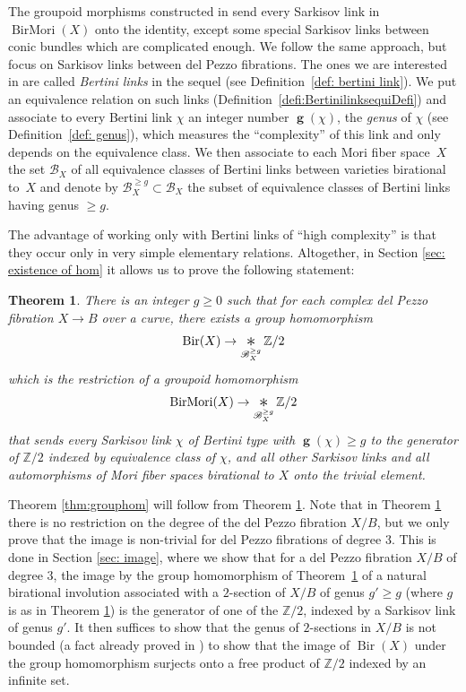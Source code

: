 \documentclass[11pt]{article}
\numberwithin{equation}{section}
\DeclareMathOperator{\Bir}{Bir}
\DeclareMathOperator{\inv}{\boldsymbol{g}}
\DeclareMathOperator{\BirMori}{BirMori}
\theoremstyle{plain}
\newtheorem{maintheorem}{Theorem}
\theoremstyle{definition}
\newcommand{\ZZ}{\mathbb Z}
\newcommand{\Bertini}{\mathscr B}
\newcommand{\bigast}{\mathop{\mathchoice{\vcenter{\hbox{\scalebox{1.5}{$\ast$}}}}{\ast}{\ast}{\ast}}}
\begin{document}
The groupoid morphisms constructed in \cite{BLZ} send every Sarkisov link in $\BirMori(X)$ onto the identity, except some special Sarkisov links between conic bundles which are complicated enough. We follow the same approach, but focus on Sarkisov links between del Pezzo fibrations. The ones we are interested in are called \emph{Bertini links} in the sequel (see Definition~\ref{def: bertini link}). We put an equivalence relation on such links (Definition~\ref{defi:BertinilinksequiDefi}) and associate to every Bertini link $\chi$ an integer number $\inv(\chi)$, the \emph{genus} of $\chi$ (see Definition~\ref{def: genus}), which measures the ``complexity'' of this link and only depends on the equivalence class. We then associate to each Mori fiber space~$X$ the set $\Bertini_X$ of all equivalence classes of Bertini links between varieties birational to~$X$ and denote by $\Bertini_X^{\ge g}\subset \Bertini_X$ the subset of equivalence classes of Bertini links having genus $\ge g$.

The advantage of working only with Bertini links of ``high complexity'' is that they occur only in very simple elementary relations. Altogether, in Section \ref{sec: existence of hom} it allows us to prove the following statement:

\begin{maintheorem}\label{thm:BirMori}There is an integer $g\ge 0$ such that for each complex del Pezzo fibration $X\to B$ over a curve, there exists a group homomorphism
\[
\Bir(X)\to\bigast\limits_{\Bertini_X^{\ge g}}\ZZ/2
\]
which is the restriction of a groupoid homomorphism
\[
\BirMori(X)\to\bigast\limits_{\Bertini_X^{\ge g}}\ZZ/2
\]
that sends every Sarkisov link $\chi$ of Bertini type with $\inv(\chi)\ge g$ to the generator of $\ZZ/2$ indexed by equivalence class of $\chi$, and all other Sarkisov links and all automorphisms of Mori fiber spaces birational to $X$ onto the trivial element.
\end{maintheorem}

Theorem \ref{thm:grouphom} will follow from Theorem \ref{thm:BirMori}. Note that in Theorem \ref{thm:BirMori} there is no restriction on the degree of the del Pezzo fibration $X/B$, but we only prove that the image is non-trivial for del Pezzo fibrations of degree $3$. This is done in Section \ref{sec: image}, where we show that for a del Pezzo fibration $X/B$ of degree $3$, the image by the group homomorphism of Theorem~\ref{thm:BirMori} of a natural birational involution associated with a $2$-section of $X/B$ of genus $g'\ge g$ (where $g$ is as in Theorem \ref{thm:BirMori}) is the generator of one of the $\ZZ/2$, indexed by a Sarkisov link of genus $g'$. It then suffices to show that the genus of $2$-sections in $X/B$ is not bounded (a fact already proved in \cite{BCDP}) to show that the image of $\Bir(X)$ under the group homomorphism surjects onto a free product of $\ZZ/2$ indexed by an infinite set.
\end{document}

